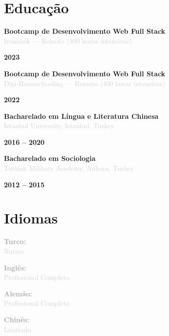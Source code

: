 \documentclass[10pt,a4paper]{article}
\newcommand{\Education}[3]{%
  \vspace{2pt}
  \noindent
  \begin{minipage}[t]{0.70\textwidth}
    {\normalsize\textbf{\color{darkgray}#1}} \\
    \textcolor{lightgray}{\small #2}
  \end{minipage}%
  \hfill
  \begin{minipage}[t]{0.28\textwidth}
    \raggedleft
    \textcolor{mediumgray}{\small\textbf{#3}}
  \end{minipage}
  \vspace{1pt}
}
\begin{document}
\section*{Educação}

\Education{Bootcamp de Desenvolvimento Web Full Stack}{Ironhack — Remoto (400 horas intensivas)}{2023}

\Education{Bootcamp de Desenvolvimento Web Full Stack}{Digi-Homeschooling — Remoto (400 horas intensivas)}{2022}

\Education{Bacharelado em Língua e Literatura Chinesa}{Istanbul University, Istanbul, Turkey}{2016 -- 2020}

\Education{Bacharelado em Sociologia}{Turkish Military Academy, Ankara, Turkey}{2012 -- 2015}

\section*{Idiomas}

\vspace{1pt}
\noindent
\begin{minipage}[t]{0.24\textwidth}
  \textcolor{darkgray}{\textbf{Turco:}} \\
  \textcolor{lightgray}{\small Nativo}
\end{minipage}%
\hfill
\begin{minipage}[t]{0.24\textwidth}
  \textcolor{darkgray}{\textbf{Inglês:}} \\
  \textcolor{lightgray}{\small Profissional Completo}
\end{minipage}%
\hfill
\begin{minipage}[t]{0.24\textwidth}
  \textcolor{darkgray}{\textbf{Alemão:}} \\
  \textcolor{lightgray}{\small Profissional Completo}
\end{minipage}%
\hfill
\begin{minipage}[t]{0.24\textwidth}
  \textcolor{darkgray}{\textbf{Chinês:}} \\
  \textcolor{lightgray}{\small Limitado}
\end{minipage}
\end{document}

